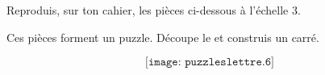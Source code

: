 \begin{myenumerate}
  \item Reproduis, sur ton cahier, les pièces ci-dessous à l'échelle 3.
  \item Ces pièces forment un puzzle. Découpe le et construis un carré.
\end{myenumerate}
\[\texttt{[image: puzzleslettre.6]}\]
